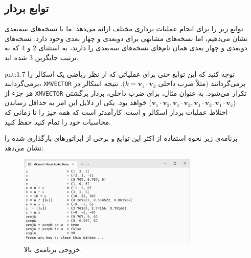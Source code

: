 \subsection{\textbf{توابع بردار}}
\label{subsec:1.6.8}
{
    \Large
    \begin{spacing}{1.5}
         توابع زیر را برای انجام عملیات برداری مختلف ارائه می‌دهد.
        ما با نسخه‌های سه‌بعدی نشان می‌دهیم، اما نسخه‌های مشابهی برای دو‌بعدی و چهار بعدی وجود دارد.
        نسخه‌های دو‌بعدی و چهار بعدی همان نام‌های نسخه‌های سه‌بعدی را دارند، به استثنای 2 و 4 که به ترتیب جایگزین 3 شده اند.
        \textbf{\vspace{6pt}}
        \lr{}
        \textbf{\vspace{-20pt}}
        \begin{point}{pnt:1.7}
            \Large
            توجه کنید که این توابع حتی برای عملیاتی که از نظر ریاضی یک اسکالر را برمی‌گردانند، \texttt{XMVECTOR} برمی‌گردانند (مثلاً ضرب داخلی $k=\textbf{v}_{1}\cdot\textbf{v}_{2}$).
            نتیجه اسکالر در هر جزء از \texttt{XMVECTOR} تکرار می‌شود. به عنوان مثال، برای ضرب داخلی، بردار برگشتی ($\textbf{v}_{1}\cdot\textbf{v}_{2},\textbf{v}_{1}\cdot\textbf{v}_{2},\textbf{v}_{1}\cdot\textbf{v}_{2},\textbf{v}_{1}\cdot\textbf{v}_{2}$) خواهد بود.
            یکی از دلایل این امر به حداقل رساندن اختلاط عملیات بردار اسکالر و  است.
            کارآمدتر است که همه چیز  را تا زمانی که محاسبات خود را تمام کنید حفظ کنید.
        \end{point}
        \textbf{\vspace{6pt}}
        برنامه‌ی زیر نحوه استفاده از اکثر این توابع و برخی از اپراتورهای بارگذاری شده را نشان می‌دهد:
        \textbf{\vspace{6pt}}
        \lr{}
        \textbf{\vspace{-30pt}}
        \begin{figure}[H]
            \centering
            \setlength{\belowcaptionskip}{-10pt}
            \includegraphics[width=0.8\textwidth]{Images/4/1/4.Session.1.1.19}
            \caption {خروجی برنامه‌ی بالا.}
            \label{fig:4.Session.1.1.19}
        \end{figure}
        \textbf{\vspace{-30pt}}


\end{spacing}}
